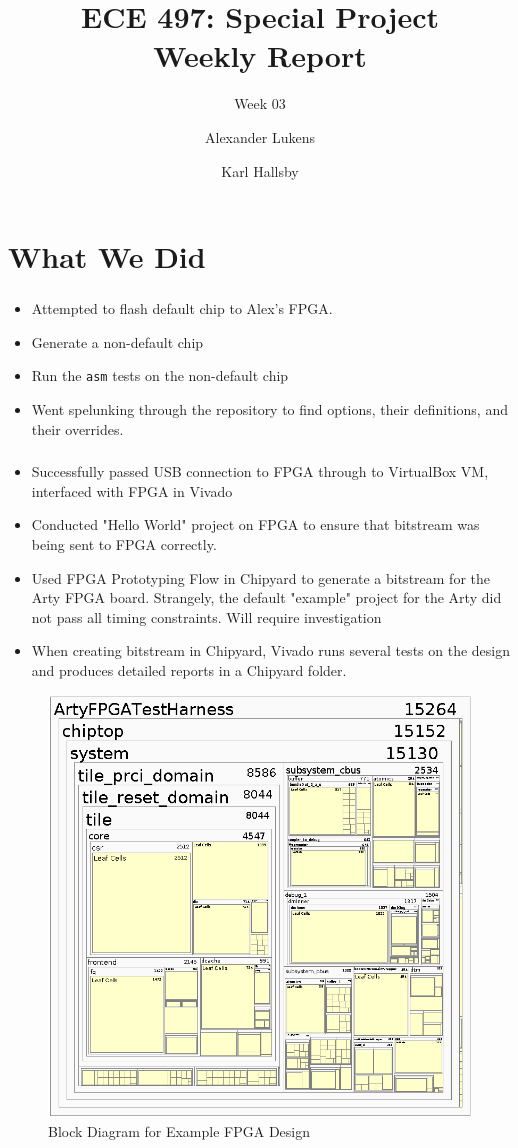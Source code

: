 \documentclass{../weeklyslides}
\title[Weekly Report]{ECE 497: Special Project \\ Weekly Report}
\subtitle{Week 03}
\author{Alexander Lukens \and Karl Hallsby}
\institute{Illinois Institute of Technology}
\date{\DTMdisplaydate{2021}{2}{11}{-1}}
\begin{document}
\nocite{chipyard}

\begin{frame}
  \titlepage{}
\end{frame}

\section{What We Did}\label{sec:What_We_Did}
\begin{frame}
  \frametitle{}
  \begin{itemize}
  \item Attempted to flash default chip to Alex's FPGA.\@
  \item Generate a non-default chip
  \item Run the \texttt{asm} tests on the non-default chip
  \item Went spelunking through the repository to find options, their definitions, and their overrides.
  \end{itemize}
\end{frame}
\begin{frame}
	\frametitle{}
	\begin{itemize}
		\item Successfully passed USB connection to FPGA through to VirtualBox VM, interfaced with FPGA in Vivado
		\item Conducted "Hello World" project on FPGA to ensure that bitstream was being sent to FPGA correctly.
		\item Used FPGA Prototyping Flow in Chipyard to generate a bitstream for the Arty FPGA board. Strangely, the default "example" project for the Arty did not pass all timing constraints. Will require investigation
		\item When creating bitstream in Chipyard, Vivado runs several tests on the design and produces detailed reports in a Chipyard folder.
	\end{itemize}
\end{frame}
\begin{frame}
	\begin{figure}[H]
		\centering
		\includegraphics[width=0.7\linewidth]{Synthesized_block_diagram}
		\caption{Block Diagram for Example FPGA Design}
		\label{fig:synthesizedblockdiagram}
	\end{figure}

\end{frame}
\end{document}
